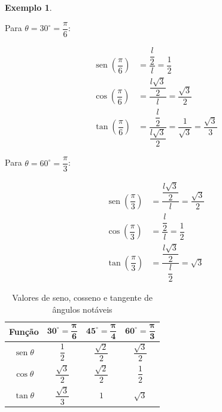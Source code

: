 \documentclass[12pt,openright,twoside,a4paper]{article}
\theoremstyle{definition}
\newtheorem{example}{Exemplo}[section]
\renewcommand{\sin}{\operatorname{sen}} %
\begin{document}
\begin{example}
\begin{center}
		\end{center}
		
		
		Para \(\theta = 30^\circ = \dfrac{\pi}{6}\):
		
		\begin{align*}
			\sin{\left(\dfrac{\pi}{6}\right)} &= \dfrac{\dfrac{l}{2}}{l} = \dfrac{1}{2} \\
			\cos{\left(\dfrac{\pi}{6}\right)} &= \dfrac{\dfrac{l\sqrt{3}}{2}}{l} = \dfrac{\sqrt{3}}{2} \\
			\tan{\left(\dfrac{\pi}{6}\right)} &= \dfrac{\dfrac{l}{2}}{\dfrac{l\sqrt{3}}{2}} = \dfrac{1}{\sqrt{3}} = \dfrac{\sqrt{3}}{3}
		\end{align*}
		
		
		Para \(\theta = 60^\circ = \dfrac{\pi}{3}\):

		\begin{align*}
			\sin{\left(\dfrac{\pi}{3}\right)} &= \dfrac{\dfrac{l\sqrt{3}}{2}}{l} = \dfrac{\sqrt{3}}{2} \\
			\cos{\left(\dfrac{\pi}{3}\right)} &= \dfrac{\dfrac{l}{2}}{l} = \dfrac{1}{2} \\
			\tan{\left(\dfrac{\pi}{3}\right)} &= \dfrac{\dfrac{l\sqrt{3}}{2}}{\dfrac{l}{2}} = \sqrt{3}
		\end{align*}
		
	\end{example}
	
	\renewcommand{\arraystretch}{2}
\begin{table}[h!]
	\centering
	\caption{Valores de seno, cosseno e tangente de ângulos notáveis}
	\begin{tabular}{|c|c|c|c|}
		\hline
		\textbf{Função} & \(\mathbf{30^\circ = \dfrac{\pi}{6}}\) & \(\mathbf{45^\circ = \dfrac{\pi}{4}}\) & \(\mathbf{60^\circ = \dfrac{\pi}{3}}\) \\
		\hline
		\(\sin{\theta}\)    & \(\dfrac{1}{2}\)          & \(\dfrac{\sqrt{2}}{2}\)      & \(\dfrac{\sqrt{3}}{2}\) \\
		\hline
		\(\cos{\theta}\)    & \(\dfrac{\sqrt{3}}{2}\)   & \(\dfrac{\sqrt{2}}{2}\)      & \(\dfrac{1}{2}\)        \\
		\hline
		\(\tan{\theta}\)    & \(\dfrac{\sqrt{3}}{3}\)   & \(1\)                        & \(\sqrt{3}\)            \\
		\hline
	\end{tabular}
\end{table}
\renewcommand{\arraystretch}{1}
\end{document}
